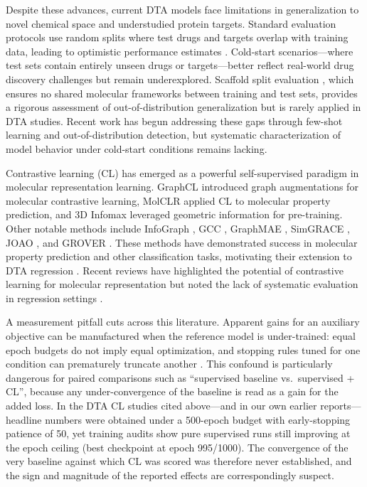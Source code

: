 \documentclass[10pt,a4paper,twocolumn]{article}
\begin{document}
Despite these advances, current DTA models face limitations in generalization to novel chemical space and understudied protein targets. Standard evaluation protocols use random splits where test drugs and targets overlap with training data, leading to optimistic performance estimates \cite{pahikkala2015toward,park2012flaws}. Cold-start scenarios---where test sets contain entirely unseen drugs or targets---better reflect real-world drug discovery challenges but remain underexplored. Scaffold split evaluation \cite{bemis1996properties}, which ensures no shared molecular frameworks between training and test sets, provides a rigorous assessment of out-of-distribution generalization but is rarely applied in DTA studies. Recent work has begun addressing these gaps through few-shot learning and out-of-distribution detection, but systematic characterization of model behavior under cold-start conditions remains lacking.

Contrastive learning (CL) has emerged as a powerful self-supervised paradigm in molecular representation learning. GraphCL \cite{you2020graphcl} introduced graph augmentations for molecular contrastive learning, MolCLR \cite{wang2022molclr} applied CL to molecular property prediction, and 3D Infomax \cite{stark2022contrastive} leveraged geometric information for pre-training. Other notable methods include InfoGraph \cite{sun2019infograph}, GCC \cite{qiu2020gcc}, GraphMAE \cite{hou2022graphmae}, SimGRACE \cite{xia2022simgrace}, JOAO \cite{you2021joao}, and GROVER \cite{rong2020grover}. These methods have demonstrated success in molecular property prediction and other classification tasks, motivating their extension to DTA regression \cite{wu2023selfsupervised,forooghi2026survey,deng2026review,david2020molecular}. Recent reviews have highlighted the potential of contrastive learning for molecular representation but noted the lack of systematic evaluation in regression settings \cite{jaiswal2021survey}.

A measurement pitfall cuts across this literature. Apparent gains for an auxiliary objective can be manufactured when the reference model is under-trained: equal epoch budgets do not imply equal optimization, and stopping rules tuned for one condition can prematurely truncate another \cite{lones2021pitfalls,damour2020underspecification}. This confound is particularly dangerous for paired comparisons such as ``supervised baseline vs.\ supervised + CL'', because any under-convergence of the baseline is read as a gain for the added loss. In the DTA CL studies cited above---and in our own earlier reports---headline numbers were obtained under a 500-epoch budget with early-stopping patience of 50, yet training audits show pure supervised runs still improving at the epoch ceiling (best checkpoint at epoch 995/1000). The convergence of the very baseline against which CL was scored was therefore never established, and the sign and magnitude of the reported effects are correspondingly suspect.
\end{document}
